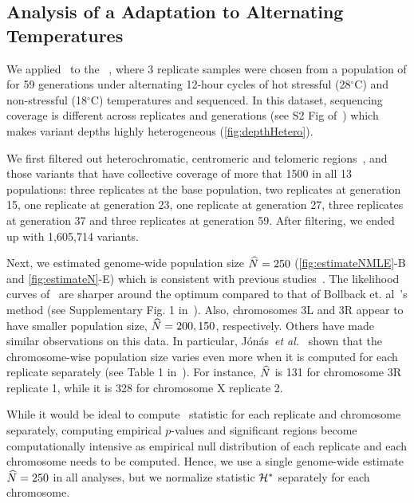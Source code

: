 \subsection{Analysis of a \dmel Adaptation to Alternating 
Temperatures}\label{sec:dmel}
We applied \comale\ to the 
\datadm~\cite{orozco2012adaptation,franssen2015patterns}, where
3 replicate samples were chosen from a population of \dmel for 59
generations under alternating 12-hour cycles of  hot stressful (28$^{\circ}$C)
and non-stressful (18$^{\circ}$C) temperatures and sequenced.  In this dataset,
sequencing coverage is different across replicates and generations
(see S2 Fig of~\cite{Terhorst2015Multi}) which makes variant depths
highly heterogeneous (\ref{fig:depthHetero}). 

We first filtered out heterochromatic, centromeric and telomeric
regions~\cite{fiston2010drosophila}, and those variants that have
collective coverage of more that 1500 in all 13 populations: three
replicates at the base population, two replicates at generation 15,
one replicate at generation 23, one replicate at generation 27, three
replicates at generation 37 and three replicates at generation
59. After filtering, we ended up with 1,605,714 variants.

Next, we estimated genome-wide population size $\widehat{N}=250$
(\ref{fig:estimateNMLE}-B and \ref{fig:estimateN}-E) which is consistent with 
previous
studies~\cite{orozco2012adaptation,jonas2016estimating}. The
likelihood curves of \comale\ are sharper around the optimum compared
to that of Bollback et. al~\cite{bollback2008estimation}'s method (see
Supplementary Fig. 1 in~\cite{orozco2012adaptation}).  Also,
chromosomes 3L and 3R appear to have smaller population
size, $\widehat{N}=200,150$, respectively. 
Others have
made similar observations on this data. In particular,
J\'{o}n\'{a}s~\emph{et al.}~\cite{jonas2016estimating} shown that the 
chromosome-wise population
size varies even more when it is computed for each replicate
separately (see Table 1 in~\cite{jonas2016estimating}). For instance,
$\widehat{N}$ is 131 for chromosome 3R replicate 1, while it is 328 for chromosome X 
replicate 2.  

While it would be ideal to compute \comale\ statistic for each
replicate and chromosome separately, computing empirical $p$-values
and significant regions become computationally intensive as empirical
null distribution of each replicate and each chromosome needs to be
computed.  Hence, we use a single genome-wide estimate $\widehat{N}=250$ in
all analyses, but we normalize statistic ${\cal H}^*$ separately for each
chromosome.

